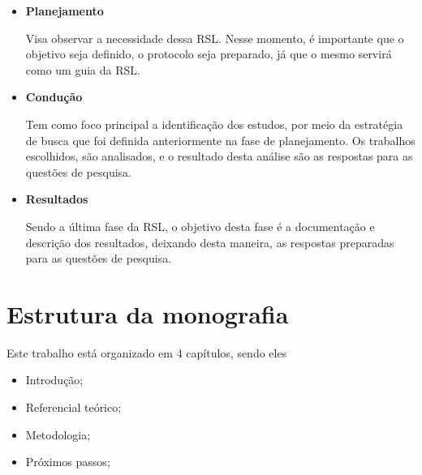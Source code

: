 \begin{itemize}
	\item \textbf{Planejamento}
	
	Visa observar a necessidade dessa RSL. Nesse momento, é importante que o objetivo seja definido, o protocolo seja preparado, já que o mesmo servirá como um guia da RSL.
	
	\item \textbf{Condução}
	
	Tem como foco principal a identificação dos estudos, por meio da estratégia de busca que foi definida anteriormente na fase de planejamento. Os trabalhos escolhidos, são analisados, e o resultado desta análise são as respostas para as questões de pesquisa.
	
	
	\item \textbf{Resultados}
	
	Sendo a última fase da RSL, o objetivo desta fase é a documentação e descrição dos resultados, deixando desta maneira, as respostas preparadas para as questões de pesquisa.
\end{itemize}

\section{Estrutura da monografia}

Este trabalho está organizado em 4 capítulos, sendo eles

\begin{itemize}
	\item Introdução;
	
	\item Referencial teórico;
	
	\item Metodologia;
	
	\item Próximos passos;
\end{itemize}
